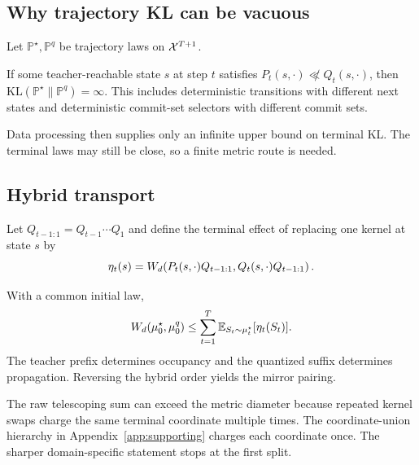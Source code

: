 \subsection{Why trajectory KL can be vacuous}
Let $\mathbb P^\star,\mathbb P^q$ be trajectory laws on $\mathcal{X}^{T+1}$.
\begin{proposition}
\label{prop:kl}
If some teacher-reachable state $s$ at step $t$ satisfies $P_t(s,\cdot)\not\ll Q_t(s,\cdot)$, then
$\mathrm{KL}(\mathbb P^\star\|\mathbb P^q)=\infty$. This includes deterministic transitions with different next states and deterministic commit-set selectors with different commit sets.
\end{proposition}
\proofapp
Data processing then supplies only an infinite upper bound on terminal KL. The terminal laws may still be close, so a finite metric route is needed.

\subsection{Hybrid transport}
Let $Q_{t-1:1}=Q_{t-1}\cdots Q_1$ and define the terminal effect of replacing one kernel at state $s$ by
\[
\eta_t(s)=W_{d}\!\left(P_t(s,\cdot)Q_{t-1:1},Q_t(s,\cdot)Q_{t-1:1}\right).
\]
\begin{theorem}
\label{thm:hybrid}
With a common initial law,
\begin{equation}
W_{d}(\mu_0^\star,\mu_0^q)
\le \sum_{t=1}^T\mathbb{E}_{S_t\sim\mu_t^\star}[\eta_t(S_t)].
\label{eq:hybrid}
\end{equation}
The teacher prefix determines occupancy and the quantized suffix determines propagation. Reversing the hybrid order yields the mirror pairing.
\end{theorem}
\proofapp
The raw telescoping sum can exceed the metric diameter because repeated kernel swaps charge the same terminal coordinate multiple times. The coordinate-union hierarchy in Appendix~\ref{app:supporting} charges each coordinate once. The sharper domain-specific statement stops at the first split.

